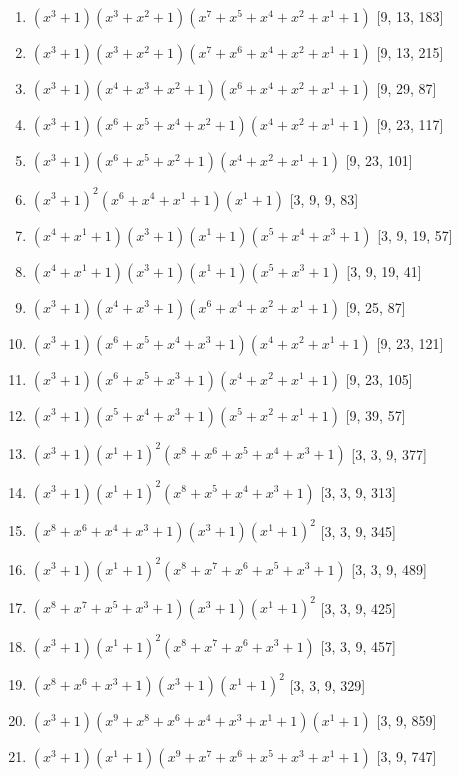 \documentclass[10pt,twocolumn]{article}
\begin{document}
\begin{enumerate}
\item $(x^{3} + 1)(x^{3} + x^{2} + 1)(x^{7} + x^{5} + x^{4} + x^{2} + x^{1} + 1)$  [9, 13, 183]
\item $(x^{3} + 1)(x^{3} + x^{2} + 1)(x^{7} + x^{6} + x^{4} + x^{2} + x^{1} + 1)$  [9, 13, 215]
\item $(x^{3} + 1)(x^{4} + x^{3} + x^{2} + 1)(x^{6} + x^{4} + x^{2} + x^{1} + 1)$  [9, 29, 87]
\item $(x^{3} + 1)(x^{6} + x^{5} + x^{4} + x^{2} + 1)(x^{4} + x^{2} + x^{1} + 1)$  [9, 23, 117]
\item $(x^{3} + 1)(x^{6} + x^{5} + x^{2} + 1)(x^{4} + x^{2} + x^{1} + 1)$  [9, 23, 101]
\item $(x^{3} + 1)^{2}(x^{6} + x^{4} + x^{1} + 1)(x^{1} + 1)$  [3, 9, 9, 83]
\item $(x^{4} + x^{1} + 1)(x^{3} + 1)(x^{1} + 1)(x^{5} + x^{4} + x^{3} + 1)$  [3, 9, 19, 57]
\item $(x^{4} + x^{1} + 1)(x^{3} + 1)(x^{1} + 1)(x^{5} + x^{3} + 1)$  [3, 9, 19, 41]
\item $(x^{3} + 1)(x^{4} + x^{3} + 1)(x^{6} + x^{4} + x^{2} + x^{1} + 1)$  [9, 25, 87]
\item $(x^{3} + 1)(x^{6} + x^{5} + x^{4} + x^{3} + 1)(x^{4} + x^{2} + x^{1} + 1)$  [9, 23, 121]
\item $(x^{3} + 1)(x^{6} + x^{5} + x^{3} + 1)(x^{4} + x^{2} + x^{1} + 1)$  [9, 23, 105]
\item $(x^{3} + 1)(x^{5} + x^{4} + x^{3} + 1)(x^{5} + x^{2} + x^{1} + 1)$  [9, 39, 57]
\item $(x^{3} + 1)(x^{1} + 1)^{2}(x^{8} + x^{6} + x^{5} + x^{4} + x^{3} + 1)$  [3, 3, 9, 377]
\item $(x^{3} + 1)(x^{1} + 1)^{2}(x^{8} + x^{5} + x^{4} + x^{3} + 1)$  [3, 3, 9, 313]
\item $(x^{8} + x^{6} + x^{4} + x^{3} + 1)(x^{3} + 1)(x^{1} + 1)^{2}$  [3, 3, 9, 345]
\item $(x^{3} + 1)(x^{1} + 1)^{2}(x^{8} + x^{7} + x^{6} + x^{5} + x^{3} + 1)$  [3, 3, 9, 489]
\item $(x^{8} + x^{7} + x^{5} + x^{3} + 1)(x^{3} + 1)(x^{1} + 1)^{2}$  [3, 3, 9, 425]
\item $(x^{3} + 1)(x^{1} + 1)^{2}(x^{8} + x^{7} + x^{6} + x^{3} + 1)$  [3, 3, 9, 457]
\item $(x^{8} + x^{6} + x^{3} + 1)(x^{3} + 1)(x^{1} + 1)^{2}$  [3, 3, 9, 329]
\item $(x^{3} + 1)(x^{9} + x^{8} + x^{6} + x^{4} + x^{3} + x^{1} + 1)(x^{1} + 1)$  [3, 9, 859]
\item $(x^{3} + 1)(x^{1} + 1)(x^{9} + x^{7} + x^{6} + x^{5} + x^{3} + x^{1} + 1)$  [3, 9, 747]

\end{enumerate}
\end{document}
